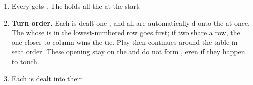 \begin{enumerate}
  \item Every  gets . The  holds all the  at the start.
  \item \textbf{Turn order.} Each  is dealt one , and all are automatically d onto the  at once. The 
    whose  is in the lowest-numbered row goes first; if two share a row, the one closer to column  wins the tie.
    Play then continues around the table in seat order. These opening  stay on the  and do not form ,
    even if they happen to touch.
  \item Each  is dealt   into their .
\end{enumerate}
